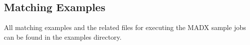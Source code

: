 





\subsection{Matching Examples}

 All matching examples and the related files for executing the MADX sample jobs can be found in the examples directory. 


